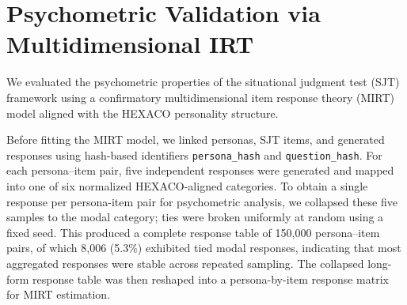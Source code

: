 

\section{Psychometric Validation via Multidimensional IRT}\label{app:mirt}

We evaluated the psychometric properties of the situational judgment test (SJT) framework using a confirmatory multidimensional item response theory (MIRT) \citep{reckase200618} model aligned with the HEXACO personality structure.

Before fitting the MIRT model, we linked personas, SJT items, and generated responses using hash-based identifiers \texttt{persona\_hash} and \texttt{question\_hash}. For each persona--item pair, five independent responses were generated and mapped into one of six normalized HEXACO-aligned categories. To obtain a single response per persona-item pair for psychometric analysis, we collapsed these five samples to the modal category; ties were broken uniformly at random using a fixed seed. This produced a complete response table of 150{,}000 persona--item pairs, of which 8{,}006 (5.3\%) exhibited tied modal responses, indicating that most aggregated responses were stable across repeated sampling. The collapsed long-form response table was then reshaped into a persona-by-item response matrix for MIRT estimation.

